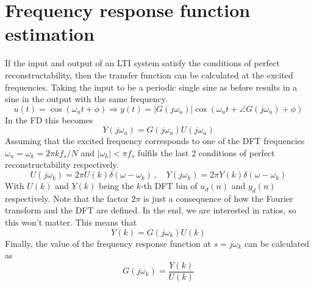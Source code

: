 \section{Frequency response function estimation}
If the input and output of an LTI system satisfy the conditions of perfect reconstructability, then the transfer function can be calculated at the excited frequencies. Taking the input to be a periodic single sine as before results in a sine in the output with the same frequency.
\begin{equation*}
    u(t) = \cos{(\omega_u t + \phi)} \Rightarrow y(t) = |G(j\omega_u)| \cos{(\omega_u t + \angle{G(j\omega_u)} + \phi)}
\end{equation*}
In the FD this becomes
\begin{equation*}
    Y(j\omega_u) = G(j\omega_u) U(j\omega_u)
\end{equation*}
Assuming that the excited frequency corresponds to one of the DFT frequencies $\omega_u = \omega_k = 2 \pi k f_s/N$  and $|\omega_k| < \pi f_s$ fulfils the last 2 conditions of perfect reconstructability respectively.
\begin{equation*}
     U(j\omega_k) = 2\pi U(k)  \delta(\omega-\omega_k) \,,\quad Y(j\omega_k) = 2\pi Y(k)  \delta(\omega-\omega_k)
\end{equation*}
With $U(k)$ and $Y(k)$ being the $k$-th DFT bin of $u_d(n)$ and $y_d(n)$ respectively. Note that the factor $2\pi$ is just a consequence of how the Fourier transform and the DFT are defined. In the end, we are interested in ratios, so this won't matter. This means that
\begin{equation}
    Y(k) = G(j\omega_k) U(k)
    \label{eq:Y=GU_DFT}
\end{equation}
Finally, the value of the frequency response function at $s = j\omega_k$ can be calculated as
\begin{equation*}
    \boxed{
    G(j\omega_k) = \frac{Y(k)}{U(k)}
    }
\end{equation*}

